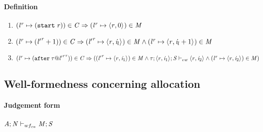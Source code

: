 \documentclass[showabstract,showacknowledgments,showpreface,showdedication]{iuphd}
\theoremstyle{nonumberplain}
\begin{document}
\paragraph{Definition}

\begin{enumerate}
    \item \label{wfconstr:constraint-start} $ ({\mathit{l}}^{\mathit{r}} \mapsto (\texttt{start}\; \mathit{r})) \in \mathit{C} \Rightarrow \\
            ({\mathit{l}}^{\mathit{r}} \mapsto \langle \mathit{r}, 0 \rangle ^{}) \in \mathit{M} $

    \item \label{wfconstr:constraint-tag} $ ({\mathit{l}}^{\mathit{r}} \mapsto ({\mathit{l}'}^{\mathit{r}} + 1)) \in \mathit{C} \Rightarrow
            \\
            ({\mathit{l}'}^{\mathit{r}} \mapsto \langle \mathit{r}, \mathit{i}_l \rangle ^{})  \in \mathit{M} \wedge \\
            ({\mathit{l}}^{\mathit{r}} \mapsto \langle \mathit{r}, \mathit{i}_l + 1 \rangle ^{})  \in \mathit{M}
            $

    \item \label{wfconstr:constraint-after} $ ({\mathit{l}}^{\mathit{r}} \mapsto (\texttt{after}\; \mathit{\tau} @ {{\mathit{l}'}^{\mathit{r}}}^{\mathit{r}})) \in \mathit{C} \Rightarrow \\
            (({\mathit{l}'}^{\mathit{r}} \mapsto \langle \mathit{r}, \mathit{i}_1 \rangle ^{}) \in \mathit{M} \wedge \\
            \mathit{\tau};\langle \mathit{r}, \mathit{i}_1 \rangle ^{};\mathit{S} \vdash_{ew} \langle \mathit{r}, \mathit{i}_2 \rangle ^{} \wedge \\
            ({\mathit{l}}^{\mathit{r}} \mapsto \langle \mathit{r}, \mathit{i}_2 \rangle ^{}) \in \mathit{M})
            $

\end{enumerate}

\subsection{Well-formedness concerning allocation}
\label{sec:well-formedness-allocation}

\paragraph{Judgement form}

$\mathit{A};\mathit{N} \vdash_{wf_{ca}} \mathit{M};\mathit{S}$
\end{document}

